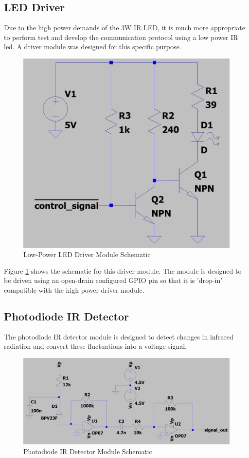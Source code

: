 \subsection{LED Driver}

Due to the high power demands of the 3W IR LED, it is much more appropriate to perform test and develop the communication protocol using a low power IR led. A driver module was designed for this specific purpose.

\begin{figure}[H]
	\centering
	\includegraphics[width=.6\textwidth]{figures/design/low_power_led_driver.JPG}
	\caption{Low-Power LED Driver Module Schematic}
	\label{fig:schematic_low_power_led_driver}
\end{figure}

Figure \ref{fig:schematic_low_power_led_driver} shows the schematic for this driver module. The module is designed to be driven using an open-drain configured GPIO pin so that it is 'drop-in' compatible with the high power driver module.

\subsection{Photodiode IR Detector}

The photodiode IR detector module is designed to detect changes in infrared radiation and convert these fluctuations into a voltage signal.

\begin{figure}[H]
	\centering
	\includegraphics[width=.8\textwidth]{figures/design/photodiode_transimpedance.JPG}
	\caption{Photodiode IR Detector Module Schematic}
	\label{fig:schematic_photodiode_transimpedance}
\end{figure}

